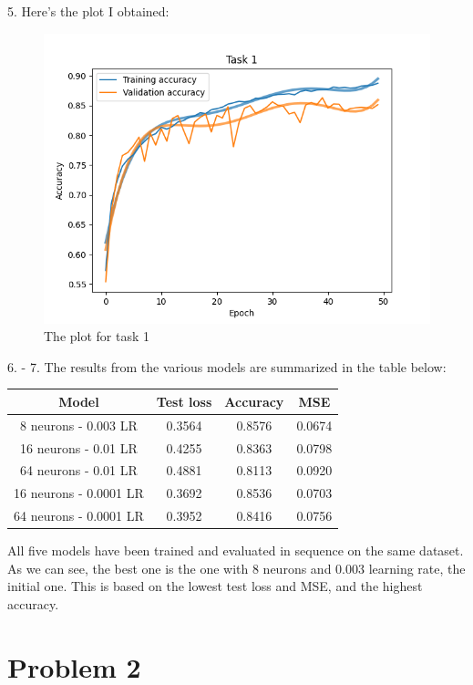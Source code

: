 \documentclass[11pt]{scrartcl}
\begin{document}
	5. Here's the plot I obtained:

	\begin{figure}[H]
		\centering
		\includegraphics[width=\textwidth]{src/plot_task1.png}
		\caption{The plot for task 1}
		\label{fig:plot_T1}
	\end{figure}

	6. - 7. The results from the various models are summarized in the table below:\\
	
	\begin{table}[H]
		\centering
		\begin{tabular}{cccc}
			Model & Test loss & Accuracy & MSE\\
			\hline
			8 neurons - 0.003 LR & 0.3564 & 0.8576 & 0.0674\\
			16 neurons - 0.01 LR & 0.4255 & 0.8363 & 0.0798\\
			64 neurons - 0.01 LR & 0.4881 & 0.8113 & 0.0920\\
			16 neurons - 0.0001 LR & 0.3692 & 0.8536 & 0.0703\\
			64 neurons - 0.0001 LR & 0.3952 & 0.8416 & 0.0756
		\end{tabular}
	\end{table}

	All five models have been trained and evaluated in sequence on the same dataset. As we can see, the best one is the one with 8 neurons and 0.003 learning rate, the initial one.
	This is based on the lowest test loss and MSE, and the highest accuracy.


\newpage
\section*{Problem 2}
\end{document}
